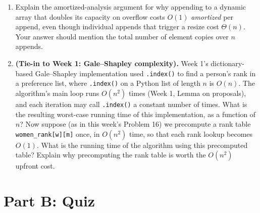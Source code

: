 \documentclass[11pt]{article}
\begin{document}
\begin{enumerate}[label=\textbf{A\arabic*.}, leftmargin=2.2em]
\item Explain the amortized-analysis argument for why appending to a dynamic array that
doubles its capacity on overflow costs $O(1)$ \emph{amortized} per append, even though
individual appends that trigger a resize cost $\Theta(n)$. Your answer should mention the
total number of element copies over $n$ appends.

\item \textbf{(Tie-in to Week 1: Gale--Shapley complexity).} Week 1's dictionary-based
Gale--Shapley implementation used \texttt{.index()} to find a person's rank in a
preference list, where \texttt{.index()} on a Python list of length $n$ is $O(n)$. The
algorithm's main loop runs $O(n^2)$ times (Week 1, Lemma on proposals), and each iteration
may call \texttt{.index()} a constant number of times. What is the resulting worst-case
running time of this implementation, as a function of $n$? Now suppose (as in this week's
Problem 16) we precompute a rank table \texttt{women\_rank[w][m]} once, in $O(n^2)$ time,
so that each rank lookup becomes $O(1)$. What is the running time of the algorithm using
this precomputed table? Explain why precomputing the rank table is worth the $O(n^2)$
upfront cost.

\end{enumerate}

\newpage
\section*{Part B: Quiz}
\end{document}
